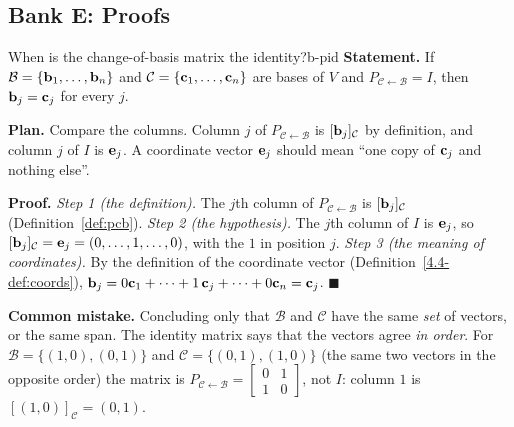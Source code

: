 \documentclass[11pt]{article}
\begin{document}
\subsection*{Bank E: Proofs}
\begin{exmp}{When is the change-of-basis matrix the identity?}{b-pid}
\textbf{Statement.} If $\mathcal{B}=\{\mathbf{b}_1,\dots,\mathbf{b}_n\}$ and $\mathcal{C}=\{\mathbf{c}_1,\dots,\mathbf{c}_n\}$ are bases of $V$ and $P_{\mathcal{C}\leftarrow\mathcal{B}}=I$, then $\mathbf{b}_j=\mathbf{c}_j$ for every $j$.

\textbf{Plan.} Compare the columns. Column $j$ of $P_{\mathcal{C}\leftarrow\mathcal{B}}$ is $[\mathbf{b}_j]_{\mathcal{C}}$ by definition, and column $j$ of $I$ is $\mathbf{e}_j$. A coordinate vector $\mathbf{e}_j$ should mean ``one copy of $\mathbf{c}_j$ and nothing else''.

\textbf{Proof.}
\emph{Step 1 (the definition).} The $j$th column of $P_{\mathcal{C}\leftarrow\mathcal{B}}$ is $[\mathbf{b}_j]_{\mathcal{C}}$ (Definition~\ref{def:pcb}).
\emph{Step 2 (the hypothesis).} The $j$th column of $I$ is $\mathbf{e}_j$, so $[\mathbf{b}_j]_{\mathcal{C}}=\mathbf{e}_j=(0,\dots,1,\dots,0)$, with the $1$ in position $j$.
\emph{Step 3 (the meaning of coordinates).} By the definition of the coordinate vector (Definition~\ref{4.4-def:coords}), $\mathbf{b}_j=0\mathbf{c}_1+\cdots+1\,\mathbf{c}_j+\cdots+0\mathbf{c}_n=\mathbf{c}_j$. \qquad$\blacksquare$

\textbf{Common mistake.} Concluding only that $\mathcal{B}$ and $\mathcal{C}$ have the same \emph{set} of vectors, or the same span. The identity matrix says that the vectors agree \emph{in order}. For $\mathcal{B}=\{(1,0),(0,1)\}$ and $\mathcal{C}=\{(0,1),(1,0)\}$ (the same two vectors in the opposite order) the matrix is $P_{\mathcal{C}\leftarrow\mathcal{B}}=\begin{bmatrix}0&1\\1&0\end{bmatrix}$, not $I$: column $1$ is $[(1,0)]_{\mathcal{C}}=(0,1)$.
\end{exmp}
\end{document}
